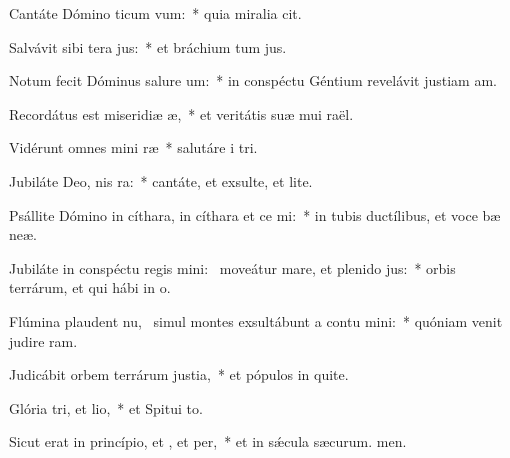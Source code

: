 \item Cantáte Dómino ticum vum:~* quia miralia cit.
\item Salvávit sibi tera jus:~* et bráchium tum jus.
\item Notum fecit Dóminus salure um:~* in conspéctu Géntium revelávit justiam am.
\item Recordátus est miseridiæ æ,~* et veritátis suæ mui raël.
\item Vidérunt omnes mini ræ~* salutáre i tri.
\item Jubiláte Deo, nis ra:~* cantáte, et exsulte, et lite.
\item Psállite Dómino in cíthara, in cíthara et ce mi:~* in tubis ductílibus, et voce bæ neæ.
\item Jubiláte in conspéctu regis mini:~\pscross{} moveátur mare, et plenido jus:~* orbis terrárum, et qui hábi in o.
\item Flúmina plaudent nu,~\pscross{} simul montes exsultábunt a contu mini:~* quóniam venit judire ram.
\item Judicábit orbem terrárum  justia,~* et pópulos in quite.
\item Glória tri, et lio,~* et Spitui to.
\item Sicut erat in princípio, et , et per,~* et in sǽcula sæcurum. men.
